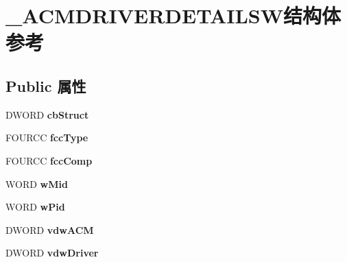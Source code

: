 \hypertarget{struct___a_c_m_d_r_i_v_e_r_d_e_t_a_i_l_s_w}{}\section{\+\_\+\+A\+C\+M\+D\+R\+I\+V\+E\+R\+D\+E\+T\+A\+I\+L\+S\+W结构体 参考}
\label{struct___a_c_m_d_r_i_v_e_r_d_e_t_a_i_l_s_w}
\subsection*{Public 属性}
\begin{DoxyCompactItemize}
\item 
\mbox{\label{struct___a_c_m_d_r_i_v_e_r_d_e_t_a_i_l_s_w_a28bc33d209fb08d0fa91034d5431e857}} 
D\+W\+O\+RD {\bfseries cb\+Struct}
\item 
\mbox{\label{struct___a_c_m_d_r_i_v_e_r_d_e_t_a_i_l_s_w_acadfb5e64ae27c1b37d711e8bed4ba5b}} 
F\+O\+U\+R\+CC {\bfseries fcc\+Type}
\item 
\mbox{\label{struct___a_c_m_d_r_i_v_e_r_d_e_t_a_i_l_s_w_ab31ab3b3b2074ba6f3584dac4970c468}} 
F\+O\+U\+R\+CC {\bfseries fcc\+Comp}
\item 
\mbox{\label{struct___a_c_m_d_r_i_v_e_r_d_e_t_a_i_l_s_w_a4e3efee146bbd9c5ff29d022ae0d6aba}} 
W\+O\+RD {\bfseries w\+Mid}
\item 
\mbox{\label{struct___a_c_m_d_r_i_v_e_r_d_e_t_a_i_l_s_w_a64eeac427029399ee29d25e6d25fb69a}} 
W\+O\+RD {\bfseries w\+Pid}
\item 
\mbox{\label{struct___a_c_m_d_r_i_v_e_r_d_e_t_a_i_l_s_w_aac6e57f1df326f84d3c6a0361e242a13}} 
D\+W\+O\+RD {\bfseries vdw\+A\+CM}
\item 
\mbox{\label{struct___a_c_m_d_r_i_v_e_r_d_e_t_a_i_l_s_w_af357f13bdccbc6a356c335ba4a4d73e8}} 
D\+W\+O\+RD {\bfseries vdw\+Driver}
\item 

\end{DoxyCompactItemize}
